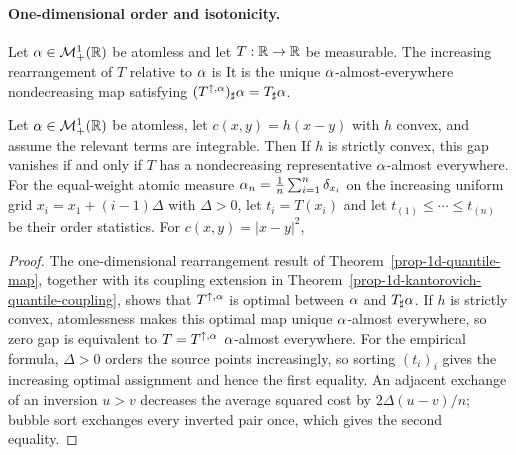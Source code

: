\paragraph{One-dimensional order and isotonicity.}
\begin{defn}\label{def-increasing-rearrangement-map}
Let $\alpha\in\mathcal{M}_+^1(\mathbb{R})$ be atomless and let $T:\mathbb{R}\to\mathbb{R}$ be measurable. The increasing rearrangement of $T$ relative to $\alpha$ is
It is the unique $\alpha$-almost-everywhere nondecreasing map satisfying $(T^{\uparrow,\alpha})_\sharp\alpha=T_\sharp\alpha$.
\end{defn}
\begin{prop}\label{prop-monge-gap-one-dimensional}
Let $\alpha\in\mathcal{M}_+^1(\mathbb{R})$ be atomless, let $c(x,y)=h(x-y)$ with $h$ convex, and assume the relevant terms are integrable. Then
If $h$ is strictly convex, this gap vanishes if and only if $T$ has a nondecreasing representative $\alpha$-almost everywhere.
For the equal-weight atomic measure $\alpha_n=\frac1n\sum_{i=1}^n\delta_{x_i}$ on the increasing uniform grid $x_i=x_1+(i-1)\Delta$ with $\Delta>0$, let $t_i=T(x_i)$ and let $t_{(1)}\leq\cdots\leq t_{(n)}$ be their order statistics. For $c(x,y)=|x-y|^2$,
\end{prop}
\begin{proof}
The one-dimensional rearrangement result of Theorem~\ref{prop-1d-quantile-map}, together with its coupling extension in Theorem~\ref{prop-1d-kantorovich-quantile-coupling}, shows that $T^{\uparrow,\alpha}$ is optimal between $\alpha$ and $T_\sharp\alpha$. If $h$ is strictly convex, atomlessness makes this optimal map unique $\alpha$-almost everywhere, so zero gap is equivalent to $T=T^{\uparrow,\alpha}$ $\alpha$-almost everywhere. For the empirical formula, $\Delta>0$ orders the source points increasingly, so sorting $(t_i)_i$ gives the increasing optimal assignment and hence the first equality. An adjacent exchange of an inversion $u>v$ decreases the average squared cost by $2\Delta(u-v)/n$; bubble sort exchanges every inverted pair once, which gives the second equality.
\end{proof}
